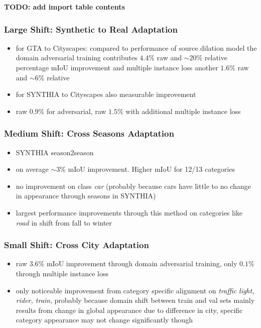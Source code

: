 \documentclass[]{article}
\newcommand{\todo}[1]{{\color{red}\bf{TODO: #1}}}
\begin{document}
\todo{add import table contents}

\subsubsection{Large Shift: Synthetic to Real Adaptation}
\begin{itemize}
	\item for GTA to Cityscapes: compared to performance of source dilation model the domain adversarial training contributes $4.4\%$ raw and $\sim 20\%$ relative percentage mIoU improvement and multiple instance loss another $1.6\%$ raw and $\sim 6 \%$ relative
	\item for SYNTHIA to Cityscapes also measurable improvement
	\item raw $0.9\%$ for adversarial, raw $1.5\%$ with additional multiple instance loss
\end{itemize}

\subsubsection{Medium Shift: Cross Seasons Adaptation}
\begin{itemize}
	\item SYNTHIA season2season
	\item on average $\sim 3 \%$ mIoU improvement. Higher mIoU for 12/13 categories
	\item no improvement on class \textit{car} (probably because cars have little to no change in appearance through seasons in SYNTHIA)
	\item largest performance improvements through this method on categories like \textit{road} in shift from fall to winter
\end{itemize}

\subsubsection{Small Shift: Cross City Adaptation}
\begin{itemize}
	\item raw $3.6\%$ mIoU improvement through domain adversarial training, only $0.1\%$ through multiple instance loss
	\item only noticeable improvement from category specific alignment on \textit{traffic light, rider, train}, probably because domain shift between train and val sets mainly results from change in global appearance due to difference in city, specific category appearance may not change significantly though
\end{itemize}
\end{document}
